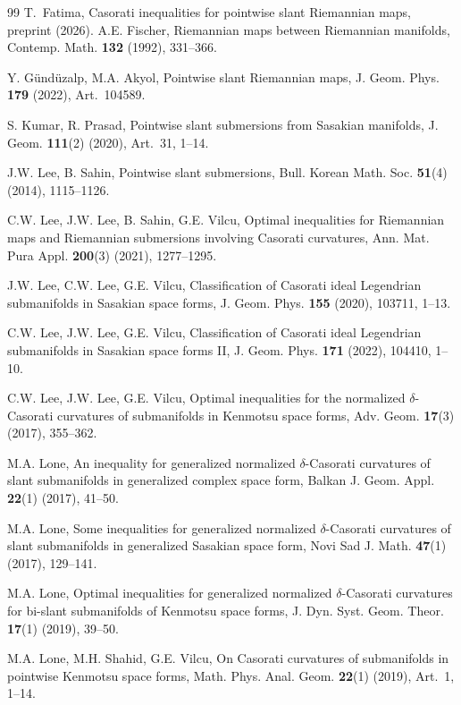 \documentclass[11pt]{amsart}
\theoremstyle{plain}
\theoremstyle{definition}
\theoremstyle{remark}
\begin{document}
\begin{thebibliography}{99}
  T.~Fatima, {Casorati inequalities for pointwise slant Riemannian
  maps}, preprint (2026).
A.E. Fischer, Riemannian maps between Riemannian manifolds,
Contemp. Math. \textbf{132} (1992), 331--366.

Y. G\"und\"uzalp, M.A. Akyol, Pointwise slant Riemannian maps,
J. Geom. Phys. \textbf{179} (2022), Art.~104589.

S. Kumar, R. Prasad, Pointwise slant submersions from Sasakian manifolds,
J. Geom. \textbf{111}(2) (2020), Art.~31, 1--14.

J.W. Lee, B. Sahin, Pointwise slant submersions,
Bull. Korean Math. Soc. \textbf{51}(4) (2014), 1115--1126.

C.W. Lee, J.W. Lee, B. Sahin, G.E. Vilcu, Optimal inequalities for Riemannian
maps and Riemannian submersions involving Casorati curvatures,
Ann. Mat. Pura Appl. \textbf{200}(3) (2021), 1277--1295.

J.W. Lee, C.W. Lee, G.E. Vilcu, Classification of Casorati ideal Legendrian
submanifolds in Sasakian space forms,
J. Geom. Phys. \textbf{155} (2020), 103711, 1--13.

C.W. Lee, J.W. Lee, G.E. Vilcu, Classification of Casorati ideal Legendrian
submanifolds in Sasakian space forms II,
J. Geom. Phys. \textbf{171} (2022), 104410, 1--10.

C.W. Lee, J.W. Lee, G.E. Vilcu, Optimal inequalities for the normalized
$\delta$-Casorati curvatures of submanifolds in Kenmotsu space forms,
Adv. Geom. \textbf{17}(3) (2017), 355--362.

M.A. Lone, An inequality for generalized normalized $\delta$-Casorati
curvatures of slant submanifolds in generalized complex space form,
Balkan J. Geom. Appl. \textbf{22}(1) (2017), 41--50.

M.A. Lone, Some inequalities for generalized normalized $\delta$-Casorati
curvatures of slant submanifolds in generalized Sasakian space form,
Novi Sad J. Math. \textbf{47}(1) (2017), 129--141.

M.A. Lone, Optimal inequalities for generalized normalized $\delta$-Casorati
curvatures for bi-slant submanifolds of Kenmotsu space forms,
J. Dyn. Syst. Geom. Theor. \textbf{17}(1) (2019), 39--50.

M.A. Lone, M.H. Shahid, G.E. Vilcu, On Casorati curvatures of submanifolds in
pointwise Kenmotsu space forms,
Math. Phys. Anal. Geom. \textbf{22}(1) (2019), Art.~1, 1--14.


\end{thebibliography}
\end{document}
